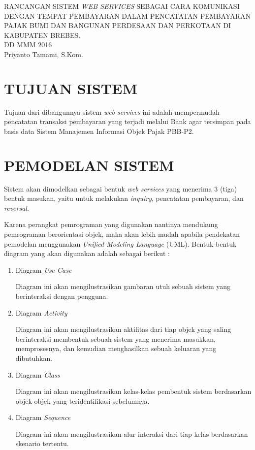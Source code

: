 \documentclass[pdftex,12pt, oneside]{article}
\begin{document}
\sloppy %

\begin{center}
{\large RANCANGAN SISTEM \textit{WEB SERVICES} SEBAGAI CARA KOMUNIKASI DENGAN TEMPAT PEMBAYARAN DALAM PENCATATAN PEMBAYARAN PAJAK BUMI DAN BANGUNAN PERDESAAN DAN PERKOTAAN DI KABUPATEN BREBES.}
\\[1cm]
DD MMM 2016\\
Priyanto Tamami, S.Kom.
\end{center}




\section{TUJUAN SISTEM}

Tujuan dari dibangunnya sistem \textit{web services} ini adalah mempermudah pencatatan transaksi pembayaran yang terjadi melalui Bank agar tersimpan pada basis data Sistem Manajemen Informasi Objek Pajak PBB-P2.


\section{PEMODELAN SISTEM}

Sistem akan dimodelkan sebagai bentuk \textit{web services} yang menerima 3 (tiga) bentuk masukan, yaitu untuk melakukan \textit{inquiry}, pencatatan pembayaran, dan \textit{reversal}.

Karena perangkat pemrograman yang digunakan nantinya mendukung pemrograman berorientasi objek, maka akan lebih mudah apabila pendekatan pemodelan menggunakan \textit{Unified Modeling Language} (UML). Bentuk-bentuk diagram yang akan digunakan adalah sebagai berikut :

\begin{enumerate}
  \item Diagram \textit{Use-Case}
  
  Diagram ini akan mengilustrasikan gambaran utuh sebuah sistem yang berinteraksi dengan pengguna.
  
  \item Diagram \textit{Activity}
  
  Diagram ini akan mengilustrasikan aktifitas dari tiap objek yang saling berinteraksi membentuk sebuah sistem yang menerima masukkan, memprosesnya, dan kemudian menghasilkan sebuah keluaran yang dibutuhkan.
  
  \item Diagram \textit{Class}
  
  Diagram ini akan mengilustrasikan kelas-kelas pembentuk sistem berdasarkan objek-objek yang teridentifikasi sebelumnya.
  
  \item Diagram \textit{Sequence}
  
  Diagram ini akan mengilustrasikan alur interaksi dari tiap kelas berdasarkan skenario tertentu.
  
\end{enumerate}
\end{document}
